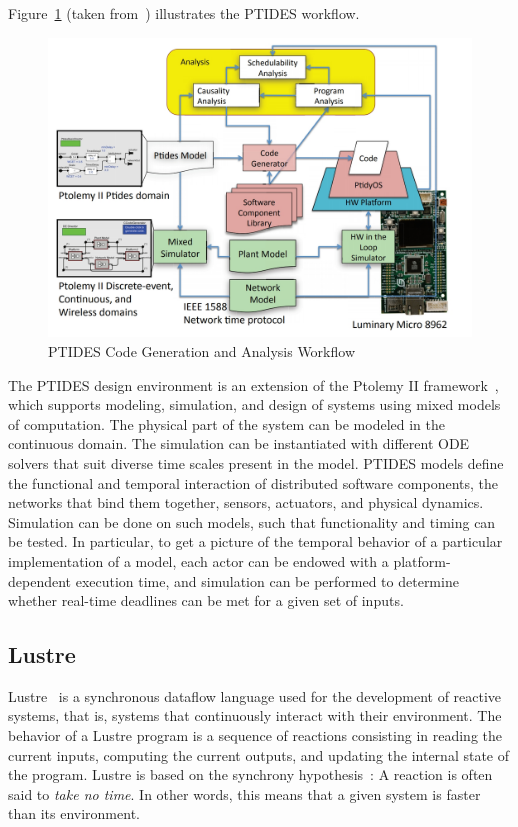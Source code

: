Figure~\ref{fig:ptides} (taken from~\cite{intro:ptides}) illustrates the PTIDES workflow.
\begin{figure}[h]
  \includegraphics[scale=0.3]{Figures/ptides}
  \caption{PTIDES Code Generation and Analysis Workflow}
  \label{fig:ptides}
\end{figure}

The PTIDES design environment is an extension of the Ptolemy II framework~\cite{intro:ptides3},
which supports modeling, simulation, and design of systems using mixed models of computation. 
The physical part of the system can be modeled in the continuous domain. The simulation can be 
instantiated with different ODE solvers that suit diverse time scales present in the model. 
PTIDES models define the functional and temporal interaction of distributed software components,
the networks that bind them together, sensors, actuators, and physical dynamics. 
Simulation can be done on such models, such that functionality and timing can be 
tested. In particular, to get a picture of the temporal behavior
of a particular implementation of a model, each actor can
be endowed with a platform-dependent execution time, and
simulation can be performed to determine whether real-time
deadlines can be met for a given set of inputs.


\subsection{Lustre}
Lustre~\cite{intro:lustre} is a synchronous dataflow language used for the development of 
reactive systems, that is, systems that continuously interact with their environment.
The behavior of a Lustre program is a sequence of reactions consisting in reading the current 
inputs, computing the current outputs, and updating the internal state of the program. 
Lustre is based on the synchrony hypothesis~\cite{intro:lustre2}: A reaction is often said to 
\emph{take no time}. In other words, this means that a given system is faster than its 
environment. 

